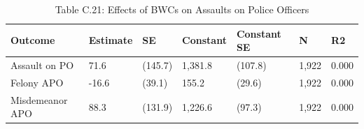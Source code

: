\begin{table}

\caption{Table C.21: Effects of BWCs on Assaults on Police Officers}
\centering
\begin{tabular}[t]{lllllll}
\toprule
Outcome & Estimate & SE & Constant & Constant SE & N & R2\\
\midrule
Assault on PO & 71.6 & (145.7) & 1,381.8 & (107.8) & 1,922 & 0.000\\
Felony APO & -16.6 & (39.1) & 155.2 & (29.6) & 1,922 & 0.000\\
Misdemeanor APO & 88.3 & (131.9) & 1,226.6 & (97.3) & 1,922 & 0.000\\
\bottomrule
\end{tabular}
\end{table}
